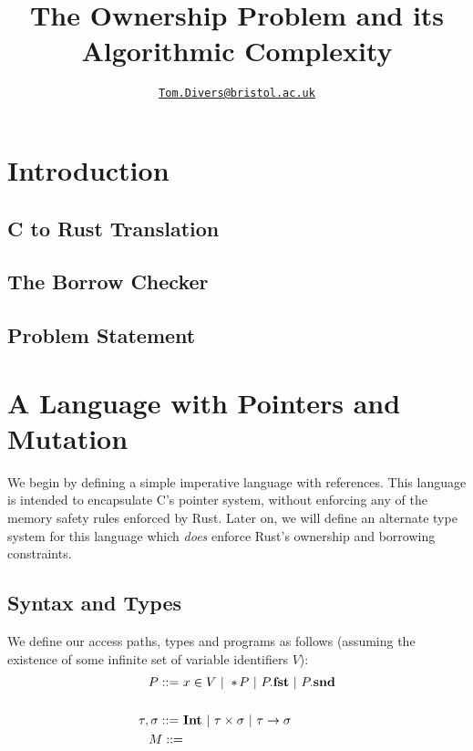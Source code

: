 \documentclass{article}
\title{The Ownership Problem and its Algorithmic Complexity}
\author{\href{mailto:oi24939@bristol.ac.uk}{\texttt{Tom.Divers@bristol.ac.uk}}}
\date{}
\newcommand{\drfStar}{*\hspace{0.07em}}
\begin{document}
\maketitle

\section{Introduction}

\subsection{C to Rust Translation}

\cite{zhang2023crown}

\subsection{The Borrow Checker}

\subsection{Problem Statement}

\section{A Language with Pointers and Mutation}

We begin by defining a simple imperative language with references. This language is intended to encapsulate C's pointer system, without enforcing any of the memory safety rules enforced by Rust. Later on, we will define an alternate type system for this language which \textit{does} enforce Rust's ownership and borrowing constraints.

\subsection{Syntax and Types}

We define our access paths, types and programs as follows (assuming the existence of some infinite set of variable identifiers $V$):
\begin{align*}
    P ::=~ &x \in V ~|~ \drfStar \! P ~|~ P.\textbf{fst} ~|~ P.\textbf{snd}\\
    ~\\
    \tau, \sigma ::=~ &\textbf{Int} ~|~ \tau \times \sigma ~|~ \tau \rightarrow \sigma
    ~\\
    M ::= &
\end{align*}
\end{document}
